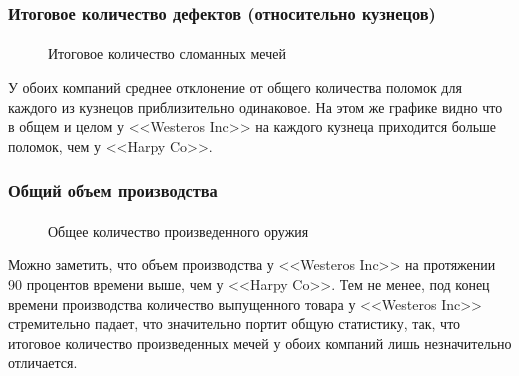 \documentclass[10pt,pdf,hyperref={unicode}]{beamer}
\begin{document}
\begin{frame}
\frametitle{Итоговое количество дефектов (относительно кузнецов)} 
\framesubtitle{}

\begin{minipage}{0.4\textwidth}
 	\begin{figure}[L]
		\caption{Итоговое количество сломанных мечей}	
	\end{figure}
\end{minipage}
\hfill
\begin{minipage}{0.4\textwidth}
	У обоих компаний среднее отклонение от общего количества поломок для каждого из кузнецов приблизительно одинаковое. На этом же графике видно что в общем и целом у <<Westeros Inc>> на каждого кузнеца приходится больше поломок, чем у <<Harpy Co>>.   
\end{minipage}
\end{frame}


\begin{frame}
\frametitle{Общий объем производства} 
\framesubtitle{}

\begin{minipage}{0.4\textwidth}
 	\begin{figure}[L]
		\caption{Общее количество произведенного оружия}	
	\end{figure}
\end{minipage}
\hfill
\begin{minipage}{0.4\textwidth}
	Можно заметить, что объем производства у <<Westeros Inc>> на протяжении 90 процентов времени выше, чем у <<Harpy Co>>. Тем не менее, под конец времени производства количество выпущенного товара у <<Westeros Inc>> стремительно падает, что значительно портит общую статистику, так, что итоговое количество произведенных мечей у обоих компаний лишь незначительно отличается.  
\end{minipage}
\end{frame}
\end{document}
